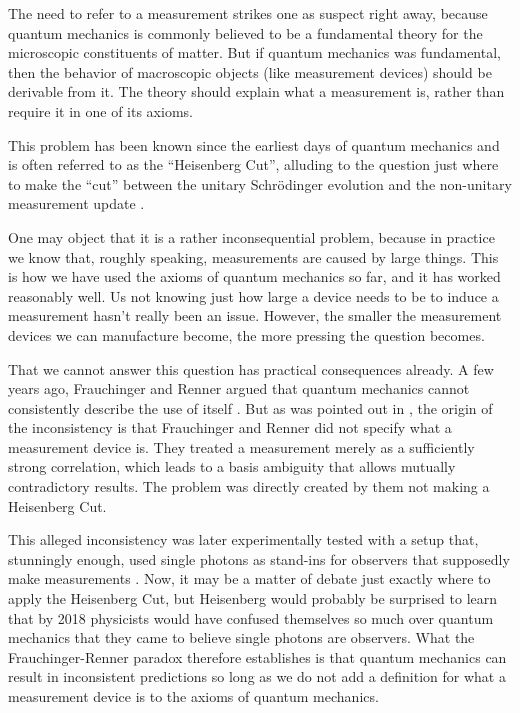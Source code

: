 \documentclass[superscriptaddress,floatfix,nofootinbib,12pt]{revtex4-2}
\begin{document}
The need to refer to a measurement strikes one as suspect right away, because quantum mechanics is commonly believed to be a fundamental theory for the microscopic constituents of matter. But if quantum mechanics was fundamental, then the behavior of macroscopic objects (like measurement devices) should be derivable from it. The theory should explain what a measurement is, rather than require it in one of its axioms. 
 
This problem has been known since the earliest days of quantum mechanics and is often referred to as the ``Heisenberg Cut'', alluding to the question just where to make the ``cut'' between the unitary Schr\"odinger evolution and the non-unitary measurement update \cite{Heisenberg1952Cut}.
 
One may object that it is a rather inconsequential problem, because in practice we know that, roughly speaking, measurements are caused by large things. This is how we have used the axioms of quantum mechanics so far, and it has worked reasonably well. Us not knowing just how large a device needs to be to induce a measurement hasn't really been an issue. However, the smaller the measurement devices we can manufacture become, the more pressing the question becomes.
 
That we cannot answer this question has practical consequences already. A few years ago, Frauchinger and Renner argued that quantum mechanics cannot consistently describe the use of itself \cite{frauchiger2018quantum}. But as was pointed out in \cite{relano2018decoherence,zukowski2021physics}, the origin of the inconsistency is that Frauchinger and Renner did not specify what a measurement device is. They treated a measurement merely as a sufficiently strong correlation, which leads to a basis ambiguity that allows mutually contradictory results. The problem was directly created by them not making a Heisenberg Cut.

This alleged inconsistency was later experimentally tested with a setup that, stunningly enough, used single photons as stand-ins for observers that supposedly make measurements \cite{proietti2019experimental}. Now, it may be a matter of debate just exactly where to apply the Heisenberg Cut, but Heisenberg would probably be surprised to learn that by 2018 physicists would have confused themselves so much over quantum mechanics that they came to believe single photons are observers. 
What the Frauchinger-Renner paradox therefore establishes is that quantum mechanics can result in inconsistent predictions so long as we do not add a definition for what a measurement device is to the axioms of quantum mechanics.
\end{document}
